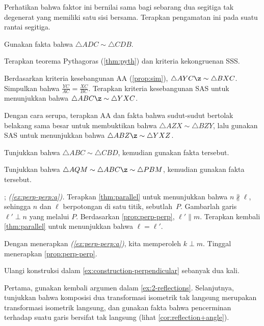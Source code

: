 Perhatikan bahwa faktor ini bernilai sama bagi sebarang dua segitiga tak degenerat yang memiliki satu sisi bersama.
Terapkan pengamatan ini pada suatu rantai segitiga.

Gunakan fakta bahwa $\triangle ADC\sim \triangle CDB$.

Terapkan teorema Pythagoras (\ref{thm:pyth}) dan kriteria kekongruenan SSS.

Berdasarkan kriteria kesebangunan AA (\ref{prop:sim}), $\triangle AYC\z\sim \triangle BXC$.
Simpulkan bahwa
$\frac{YC}{AC}=\frac{XC}{BC}$.
Terapkan kriteria kesebangunan SAS untuk menunjukkan bahwa $\triangle ABC\z\sim \triangle YXC$.

Dengan cara serupa, terapkan AA dan fakta bahwa sudut-sudut bertolak belakang sama besar untuk membuktikan bahwa $\triangle AZX\sim \triangle BZY$, lalu gunakan SAS untuk menunjukkan bahwa $\triangle ABZ\z\sim \triangle YXZ$.

Tunjukkan bahwa $\triangle ABC\sim \triangle CBD$, kemudian gunakan fakta tersebut.

Tunjukkan bahwa $\triangle AQM\sim \triangle ABC\z\sim\triangle PBM$, kemudian gunakan fakta tersebut.


\setcounter{eqtn}{0}

\parbf{\ref{ex:perp-perp}}; \textit{(\ref{ex:perp-perp:a}).}
Terapkan \ref{thm:parallel} untuk menunjukkan bahwa $n\nparallel \ell$, sehingga $n$ dan $\ell$ berpotongan di satu titik, sebutlah~$P$.
Gambarlah garis $\ell'\perp n$ yang melalui $P$.
Berdasarkan \ref{prop:perp-perp}, $\ell'\parallel m$.
Terapkan kembali \ref{thm:parallel} untuk menunjukkan bahwa $\ell= \ell'$.

 Dengan menerapkan \textit{(\ref{ex:perp-perp:a})}, kita memperoleh $k\perp m$.
Tinggal menerapkan \ref{prop:perp-perp}.

Ulangi konstruksi dalam \ref{ex:construction-perpendicular} sebanyak dua kali.

Pertama, gunakan kembali argumen dalam \ref{ex:2-reflections}.
Selanjutnya, tunjukkan bahwa komposisi dua transformasi isometrik tak langsung merupakan transformasi isometrik langsung, dan gunakan fakta bahwa pencerminan terhadap suatu garis bersifat tak langsung (lihat \ref{cor:reflection+angle}).

